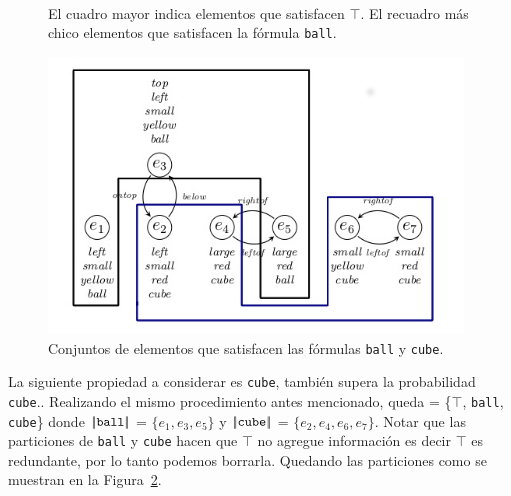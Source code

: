 \begin{figure}[H]
\begin{center}
\\[0pt]
\caption{El cuadro mayor indica elementos que satisfacen $\top$. El recuadro m\'as chico elementos que satisfacen la f\'ormula \texttt{ball}.}
\label{fig-modelo3}
\end{center}
\end{figure}


\begin{figure}[H]
\begin{center}
\includegraphics[width=11cm]{images/im/2ball-cube.jpg}
\caption{Conjuntos de elementos que satisfacen las f\'ormulas \texttt{ball} y \texttt{cube}.}
\label{fig-modelo4}
\end{center}
\end{figure}

La siguiente propiedad a considerar es \texttt{cube}, tambi\'en supera la probabilidad \texttt{cube}.\randomuse. Realizando el mismo procedimiento antes mencionado, queda \RE = \{$\top$, \texttt{ball}, \texttt{cube}\} donde $|\!|\texttt{ball}|\!|$ = $\{e_1,e_3,e_5\}$ y
$|\!|\texttt{cube}|\!|$ = $\{e_2, e_4, e_6, e_7\}$. Notar que las particiones de  \texttt{ball} y \texttt{cube} hacen que $\top$ no agregue informaci\'on es decir $\top$ es redundante, por lo tanto podemos borrarla. Quedando las particiones como se muestran en la Figura~\ref{fig-modelo4}.

